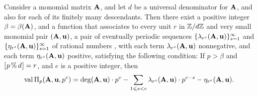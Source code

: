 \documentclass{amsart}
\begin{document}
\begin{theorem}
   \label{main theorem wrt diagonal: T}
   Consider a monomial matrix $\mathbf{A}$, and let $d$ be a universal denominator for $\mathbf{A}$, and also for each of its finitely many descendants.  Then there exist a positive integer $\beta = \beta(\mathbf{A})$, and a function that associates to every unit $r$ in $\mathbb{Z}/d\mathbb{Z}$ and very small monomial pair $(\mathbf{A}, \mathbf{u})$, a pair of eventually periodic sequences $\{ \lambda_{r^s}(\mathbf{A}, \mathbf{u})\}_{s=1}^{\infty}$  and $\{ \eta_{r^s}(\mathbf{A}, \mathbf{u}) \}_{s=1}^{\infty}$ of rational numbers%
   , with each term $\lambda_{r^s}(\mathbf{A}, \mathbf{u})$  nonnegative, and each term $\eta_{r^s}(\mathbf{A}, \mathbf{u})$  positive, satisfying the following condition:  If $p > \beta$ and $[ \hspace{.01in} p \, \% \, d \hspace{.01in} ] = r$, and $e$ is a positive integer, then
%
\[
 \operatorname{val} \Pi_p(\mathbf{A},\mathbf{u}, p^e) =  \operatorname{deg}(\mathbf{A},\mathbf{u}) \cdot p^e - \sum_{1 \leqslant s < e} \lambda_{r^s}(\mathbf{A}, \mathbf{u}) \cdot  p^{e-s} - \eta_{r^e}(\mathbf{A},\mathbf{u}).
   \]%


 

%
\end{theorem}
\end{document}
